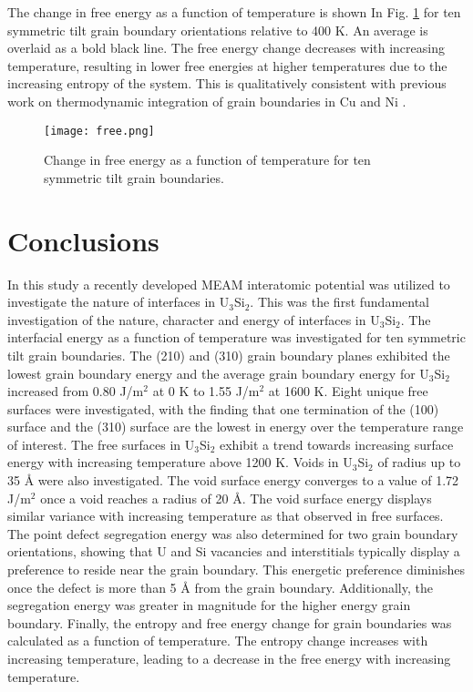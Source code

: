 \documentclass[review]{elsarticle}
\begin{document}
The change in free energy as a function of temperature is shown In Fig. \ref{fig:free} for ten symmetric tilt grain boundary orientations relative to 400 K. An average is overlaid as a bold black line. The free energy change decreases with increasing temperature, resulting in lower free energies at higher temperatures due to the increasing entropy of the system. This is qualitatively consistent with previous work on thermodynamic integration of grain boundaries in Cu \cite{frolov2012} and Ni \cite{foiles2010}. 

\begin{figure}[h]
 \centering
 \texttt{[image: free.png]} 
 \caption{Change in free energy as a function of temperature for ten symmetric tilt grain boundaries.}
 \label{fig:free}
\end{figure}

\FloatBarrier

\section{Conclusions}

In this study a recently developed MEAM interatomic potential was utilized to investigate the nature of interfaces in U$_{3}$Si$_{2}$. This was the first fundamental investigation of the nature, character and energy of interfaces in U$_{3}$Si$_{2}$. The interfacial energy as a function of temperature was investigated for ten symmetric tilt grain boundaries. The (210) and (310) grain boundary planes exhibited the lowest grain boundary energy and the average grain boundary energy for U$_{3}$Si$_{2}$ increased from 0.80 J/m$^{2}$ at 0 K to 1.55 J/m$^{2}$ at 1600 K. Eight unique free surfaces were investigated, with the finding that one termination of the (100) surface and the (310) surface are the lowest in energy over the temperature range of interest. The free surfaces in U$_{3}$Si${_2}$ exhibit a trend towards increasing surface energy with increasing temperature above 1200 K. Voids in U$_{3}$Si$_{2}$ of radius up to 35 {\AA} were also investigated. The void surface energy converges to a value of 1.72 J/m$^{2}$ once a void reaches a radius of 20 {\AA}. The void surface energy displays similar variance with increasing temperature as that observed in free surfaces. The point defect segregation energy was also determined for two grain boundary orientations, showing that U and Si vacancies and interstitials typically display a preference to reside near the grain boundary. This energetic preference diminishes once the defect is more than 5 {\AA} from the grain boundary. Additionally, the segregation energy was greater in magnitude for the higher energy grain boundary. Finally, the entropy and free energy change for grain boundaries was calculated as a function of temperature. The entropy change increases with increasing temperature, leading to a decrease in the free energy with increasing temperature. 
\end{document}
